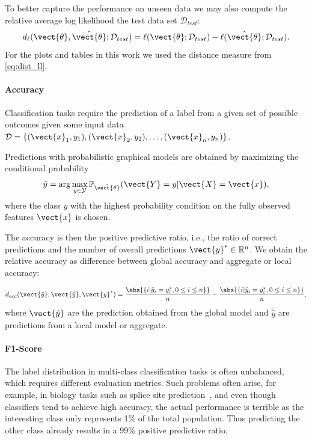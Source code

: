 To better capture the performance on unseen data we may also compute the relative average log likelihood \wrt the test data set $\mathcal{D}_{test}$:
\begin{equation}
    \label{eq:dist_ll_test}
    d_{\ell}(\vect{\theta}, \hat{\vect{\theta}}; \mathcal{D}_{test}) = \ell(\vect{\theta} ; \mathcal{D}_{test}) - \ell(\hat{\vect{\theta}} ; \mathcal{D}_{test}).
\end{equation}
For the plots and tables in this work we used the distance measure from \autoref{eq:dist_ll}.

\paragraph*{Accuracy}
Classification tasks require the prediction of a label from a given set of possible outcomes given some input data  $\mathcal{D} = \{(\vect{x}_1, y_1), (\vect{x}_2, y_2), \ldots, (\vect{x}_n, y_n)\}$.

Predictions with probabilistic graphical models are obtained by maximizing the conditional probability
\begin{equation}
    \tilde{y} = \arg\max_{y \in \mathcal{Y}} \mathbb{P}_{\tilde{\vect{\theta}}}(\vect{Y} = y \lvert \vect{X} = \vect{x}) ,
\end{equation}
where the class $y$ with the highest probability condition on the fully observed features $\vect{x}$ is chosen.

The accuracy is then the positive predictive ratio, i.e., the ratio of correct predictions and the number of overall predictions $\vect{y}^* \in \mathbb{R}^n$.
We obtain the relative accuracy as difference between global accuracy and aggregate or local accuracy:

\begin{equation}
    d_{acc}(\vect{\tilde{y}}, \vect{\hat{y}}, \vect{y}^*) =  \frac{\abs{\{i \lvert \tilde{y}_i = y^*_i, 0 \leq i \leq n\}}}{n} -  \frac{\abs{\{i \lvert \hat{y}_i = y^*_i, 0 \leq i \leq n\}}}{n},
\end{equation}
where $\vect{\hat{y}}$ are the prediction obtained from the global model and $\tilde{\hat{y}}$ are predictions from a local model or aggregate.

\paragraph*{F1-Score}
The label distribution in multi-class classification tasks is often unbalanced, which requires different evaluation metrics.
Such problems often arise, for example, in biology tasks such as splice site prediction~\cite{sonnenburg2007accurate}, and even though classifiers tend to achieve high accuracy, the actual performance is terrible as the interesting class only represents 1\% of the total population.
Thus predicting the other class already results in a 99\% positive predictive ratio.


